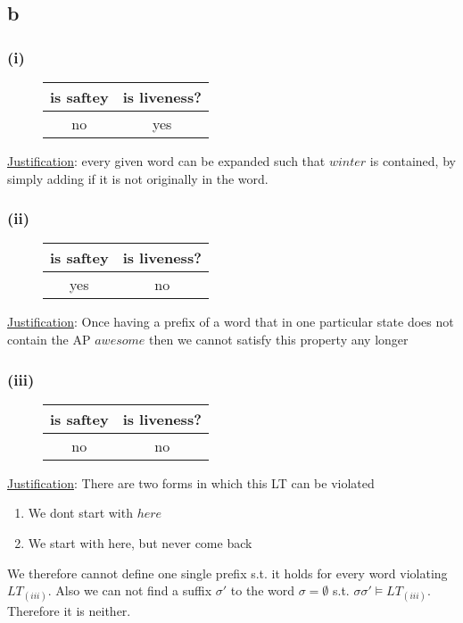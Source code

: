 \documentclass[11pt]{article}
\begin{document}
\subsection{b}

\subsubsection*{(i)}
	\vspace*{-2em}
	\begin{figure}[H]
		\centering
		\begin{tabular}{c | c}
			is saftey & is liveness? \\ \hline
			no & yes \\
		\end{tabular}
	\end{figure}
	\underline{Justification}: every given word can be expanded such that $winter$ is contained, by simply adding if it is not originally in the word.

\subsubsection*{(ii)}
	\vspace*{-2em}
	\begin{figure}[H]
		\centering
		\begin{tabular}{c | c}
			is saftey & is liveness? \\ \hline
			yes & no \\
		\end{tabular}
	\end{figure}
	\underline{Justification}: Once having a prefix of a word that in one particular state %
	does not contain the AP $awesome$ then we cannot satisfy this property any longer

\subsubsection*{(iii)}
	\vspace*{-2em}
	\begin{figure}[H]
		\centering
		\begin{tabular}{c | c}
			is saftey & is liveness? \\ \hline
			no & no \\
		\end{tabular}
	\end{figure}
	\underline{Justification}: There are two forms in which this LT can be violated 
	\begin{enumerate}
		\item We dont start with $here$
		\item We start with here, but never come back
	\end{enumerate}
	We therefore cannot define one single prefix s.t. it holds for every word violating $LT_{(iii)}$. Also we can not find a suffix $\sigma'$ to the word $\sigma = \emptyset$ s.t. $\sigma\sigma' \models LT_{(iii)}$. Therefore it is neither.
\end{document}
